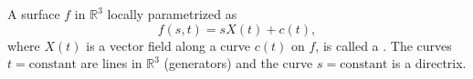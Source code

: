 A surface $f$ in $\mathbb{R}^3$ locally parametrized as
$$f(s, t) = s X(t) + c(t),$$
where $X(t)$ is a vector field along a curve $c(t)$ on $f$, is called a . The curves $t = \text{constant}$ are lines in $\mathbb{R}^3$ (generators) and the curve $s = \text{constant}$ is a directrix.

